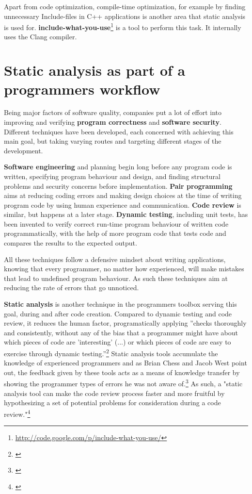 Apart from code optimization, compile-time optimization, for example by finding unnecessary Include-files in C++ applications is another area that static analysis is used for. \textbf{include-what-you-use}\footnote{\url{http://code.google.com/p/include-what-you-use/}} is a tool to perform this task. It internally uses the Clang compiler.

\section{Static analysis as part of a programmers workflow}

Being major factors of software quality, companies put a lot of effort into improving and verifying \textbf{program correctness} and \textbf{software security}. Different techniques have been developed, each concerned with achieving this main goal, but taking varying routes and targeting different stages of the development.

\textbf{Software engineering} and planning begin long before any program code is written, specifying program behaviour and design, and finding structural problems and security concerns before implementation. \textbf{Pair programming} aims at reducing coding errors and making design choices at the time of writing program code by using human experience and communication. \textbf{Code review} is similar, but happens at a later stage. \textbf{Dynamic testing}, including unit tests, has been invented to verify correct run-time program behaviour of written code programmatically, with the help of more program code that tests code and compares the results to the expected output.

All these techniques follow a defensive mindset about writing applications, knowing that every programmer, no matter how experienced, will make mistakes that lead to undefined program behaviour. As such these techniques aim at reducing the rate of errors that go unnoticed.

\textbf{Static analysis} is another technique in the programmers toolbox serving this goal, during and after code creation. Compared to dynamic testing and code review, it reduces the human factor, programatically applying ''checks thoroughly and consistently, without any of the bias that a programmer might have about which pieces of code are 'interesting' (...) or which pieces of code are easy to exercise through dynamic testing.''\footnote{\citep[22]{SecureProgramming}} Static analysis tools accumulate the knowledge of experienced programmers and as Brian Chess and Jacob West point out, the feedback given by these tools acts as a means of knowledge transfer by showing the programmer types of errors he was not aware of.\footnote{\citep[22]{SecureProgramming}} As such, a "static analysis tool can make the code review process faster and more fruitful by hypothesizing a set of potential problems for consideration during a code review."\footnote{\citep[13]{SecureProgramming}}

